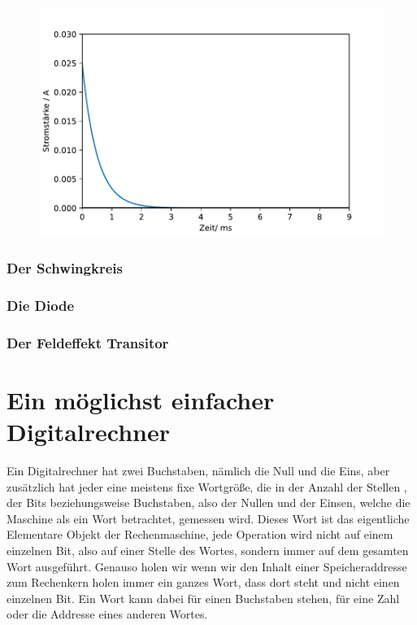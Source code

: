 \documentclass[11pt,a4paper,leqno]{report}
\numberwithin{equation}{chapter}
\begin{document}
  \begin{figure}[H]
	\begin{center}
		\includegraphics[scale=0.75]{entladungspule.pdf}
	\end{center}
\end{figure}
\noindent

\subsection{Der Schwingkreis}
\subsection{Die Diode}
\subsection{Der Feldeffekt Transitor}




\chapter{Ein m\"oglichst einfacher Digitalrechner}
Ein Digitalrechner hat zwei Buchstaben, n\"amlich die Null und die Eins, aber zus\"atzlich hat jeder eine meistens fixe Wortgr\"o\ss{}e, die in der Anzahl der Stellen , der Bits beziehungsweise Buchstaben, also der Nullen und der Einsen, welche die Maschine als ein Wort betrachtet, gemessen wird. Dieses Wort ist das eigentliche Elementare Objekt der Rechenmaschine, jede Operation wird nicht auf einem einzelnen Bit, also auf einer Stelle des Wortes, sondern immer auf dem gesamten Wort ausgef\"uhrt. Genauso holen wir wenn wir den Inhalt einer Speicheraddresse zum Rechenkern holen immer ein ganzes Wort, dass dort steht und nicht einen einzelnen Bit.
Ein Wort kann dabei f\"ur einen Buchstaben stehen, f\"ur eine Zahl oder die Addresse eines anderen Wortes. 
\end{document}
